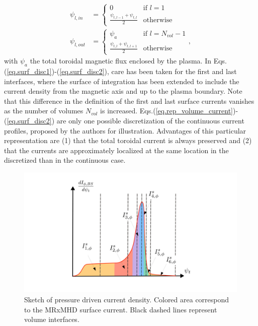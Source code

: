 \documentclass[my_thesis.tex]{subfiles}
\begin{document}
\begin{align}
    \psi_{l,in} &= \begin{cases}
    0 & \text{if } l=1\\
    \frac{\psi_{t,l-1} + \psi_{t,l}}{2} & \text{otherwise}
    \end{cases}\label{eq.surf_disc1} \\
    \psi_{l,out} &= \begin{cases}
    \psi_{a} & \text{if } l=N_{vol}-1\\
    \frac{\psi_{t,l} + \psi_{t,l+1}}{2} & \text{otherwise}
    \end{cases},\label{eq.surf_disc2}
\end{align}
with $\psi_{a}$ the total toroidal magnetic flux enclosed by the plasma. In Eqs.(\ref{eq.surf_disc1})-(\ref{eq.surf_disc2}), care has been taken for the first and last interfaces, where the surface of integration has been extended to include the current density from the magnetic axis and up to the plasma boundary. Note that this difference in the definition of the first and last surface currents vanishes as the number of volumes $N_{vol}$ is increased. Eqs.(\ref{eq.rep_volume_current})-(\ref{eq.surf_disc2}) are only one possible discretization of the continuous current profiles, proposed by the authors for illustration. Advantages of this particular representation are (1) that the total toroidal current is always preserved and (2) that the currents are approximately localized at the same location in the discretized than in the continuous case.


\begin{figure}
    \centering
    \includegraphics[width=\linewidth]{main/Figures_CurrentConstraint/ABaillod_fig4.pdf}
    \caption{Sketch of pressure driven current density. Colored area correspond to the \ac{MRxMHD} surface current. Black dashed lines represent volume interfaces.}
    \label{fig:sketch_bootstrap}
\end{figure}
\end{document}

